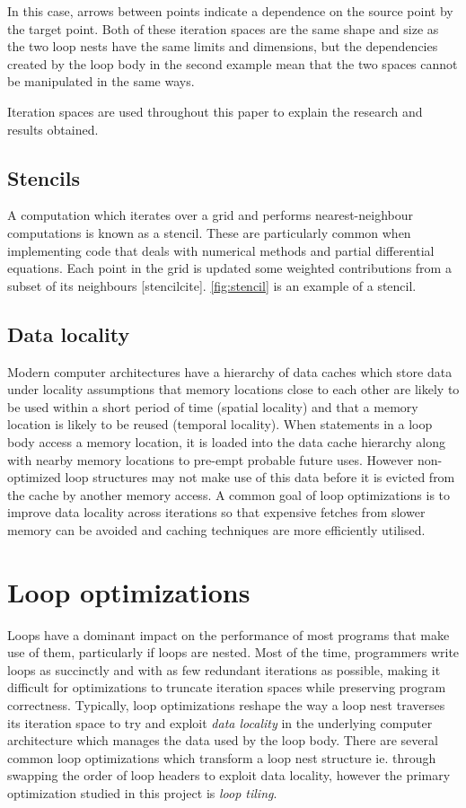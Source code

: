 \documentclass[a4paper,12pt,twoside]{report}
\begin{document}
In this case, arrows between points indicate a dependence on the source point by the target point. Both of these iteration 
spaces are the same shape and size as the two loop nests have the same limits and dimensions, but the
dependencies created by the loop body in the second example mean that the two spaces cannot be manipulated in the same ways.

Iteration spaces are used throughout this paper to explain the research and results obtained.

\subsection*{Stencils}
A computation which iterates over a grid and performs nearest-neighbour computations is known as a stencil. These are
particularly common when implementing code that deals with numerical methods and partial differential equations.
Each point in the grid is updated some weighted contributions from a subset of its neighbours [stencilcite]. \ref{fig:stencil} is an example of a stencil.

\subsection*{Data locality}
Modern computer architectures have a hierarchy of data caches which store data under locality assumptions that memory locations close to each other
are likely to be used within a short period of time (spatial locality) and that a memory location is likely to be reused (temporal locality). 
When statements in a loop body access a memory location, it is loaded into the data cache hierarchy along with nearby memory locations to pre-empt probable future uses.
However non-optimized loop structures may not make use of this data before it is evicted from the cache by another memory access.
A common goal of loop optimizations is to improve data locality across iterations so that expensive fetches from slower memory can be avoided 
and caching techniques are more efficiently utilised.

\section{Loop optimizations}
Loops have a dominant impact on the performance of most programs that make use of them, particularly if loops are nested.
Most of the time, programmers write loops as succinctly and with as few redundant iterations as possible, making it difficult
for optimizations to truncate iteration spaces while preserving program correctness. Typically, loop optimizations reshape the
way a loop nest traverses its iteration space to try and exploit \textit{data locality} in the underlying computer architecture which
manages the data used by the loop body. There are several common loop optimizations which transform a loop nest structure ie. through
swapping the order of loop headers to exploit data locality, however the primary optimization studied in this project is \textit{loop tiling}.
\end{document}
